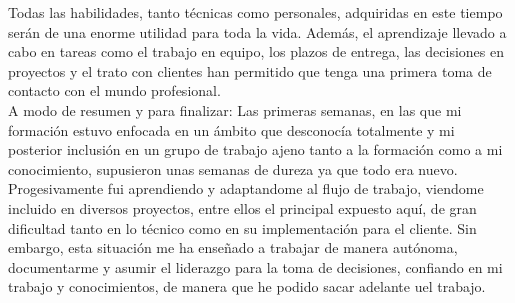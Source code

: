 Todas las habilidades, tanto técnicas como personales, adquiridas en este tiempo serán de una enorme utilidad para toda la vida. Además, el aprendizaje llevado a cabo en tareas como el trabajo en equipo, los plazos de entrega, las decisiones en proyectos y el trato con clientes han permitido que tenga una primera toma de contacto con el mundo profesional.\\

A modo de resumen y para finalizar: Las primeras semanas, en las que mi formación estuvo enfocada en un ámbito que desconocía totalmente y mi posterior inclusión en un grupo de trabajo ajeno tanto a la formación como a mi conocimiento, supusieron unas semanas de dureza ya que todo era nuevo. Progesivamente fui aprendiendo y adaptandome al flujo de trabajo, viendome incluido en diversos proyectos, entre ellos el principal expuesto aquí, de gran dificultad tanto en lo técnico como en su implementación para el cliente. Sin embargo, esta situación me ha enseñado a trabajar de manera autónoma, documentarme y asumir el liderazgo para la toma de decisiones, confiando en mi trabajo y conocimientos, de manera que he podido sacar adelante uel trabajo.
%
%
%